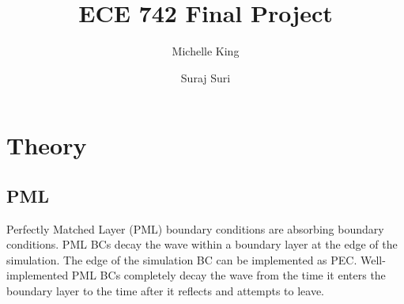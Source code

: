 \documentclass{article}
\title{ECE 742 Final Project}
\author{
  Michelle King
  \and
  Suraj Suri
  }
\begin{document}
\maketitle
\section{Theory}
\subsection{PML}
Perfectly Matched Layer (PML) boundary conditions are absorbing boundary
conditions. PML BCs decay the wave within a boundary layer at the edge of the
simulation. The edge of the simulation BC can be implemented as PEC.
Well-implemented PML BCs completely decay the wave from the time it enters the
boundary layer to the time after it reflects and attempts to leave.
\end{document}
